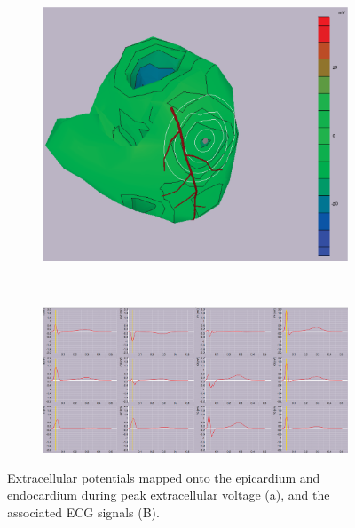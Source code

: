 \documentclass[12pt]{article}
\begin{document}
\begin{figure}[H]
	\begin{subfigure}{.75\textwidth}
		\centering
		\includegraphics[width=.95\linewidth]{Figures/1_3_pot_1.png}
		\caption{}
		
	\end{subfigure}%
\\
	\begin{subfigure}{.95\textwidth}
		\centering
		\includegraphics[width=.95\linewidth]{Figures/1_3_ecg_1.png}
		\caption{}
		
	\end{subfigure}
	\caption{Extracellular potentials mapped onto the epicardium and endocardium during peak extracellular voltage (a), and the associated ECG signals (B).}
	\label{1_3_1}
\end{figure}
\end{document}
